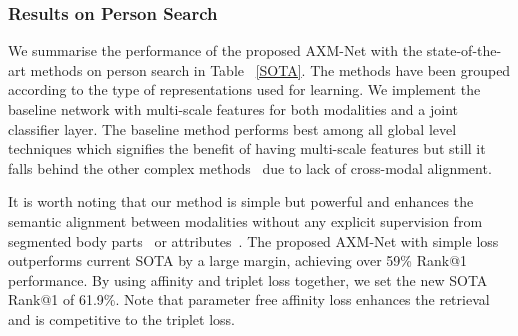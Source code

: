 \documentclass[10pt,twocolumn,letterpaper]{article}
\begin{document}
\subsubsection{Results on Person Search}
We summarise the performance of the proposed AXM-Net with the state-of-the-art methods on person search in Table ~\ref{SOTA}. The methods have been grouped according to the type of representations used for learning. We implement the baseline network with multi-scale features for both modalities and a joint classifier layer. The baseline method performs best among all global level techniques which signifies the benefit of having multi-scale features but still it falls behind the other complex methods~\cite{wang2020vitaa,aggarwal2020text,wang2020img} due to lack of cross-modal alignment.
\begin{comment}
Although ~\cite{wang2020img} uses horizontal image feature parts and intra-modal attention, this attention is performed on global feature maps followed by extracting multiple part features. However, our attentive local feature learning block attends local information of the person and its design implicitly induces both channel and spatial attentions. We incorporate context from all spatial parts to attend a given spatial part.  Other recent techniques~\cite{aggarwal2020text,wang2020vitaa}, employ multi-label classification loss over the extracted attribute features for both modalities. The features are obtained by an attribute prediction network and pixel-wise segmentation network respectively. 
\end{comment}
It is worth noting that our method is simple but powerful and enhances the semantic alignment between modalities without any explicit supervision from segmented body parts~\cite{wang2020vitaa} or attributes~\cite{aggarwal2020text}. The proposed AXM-Net with simple  loss outperforms current SOTA by a large margin, achieving over 59\% Rank@1 performance. By using affinity and triplet loss together, we set the new SOTA Rank@1 of 61.9\%. Note that parameter free affinity loss enhances the retrieval and is competitive to the triplet loss.
\end{document}
